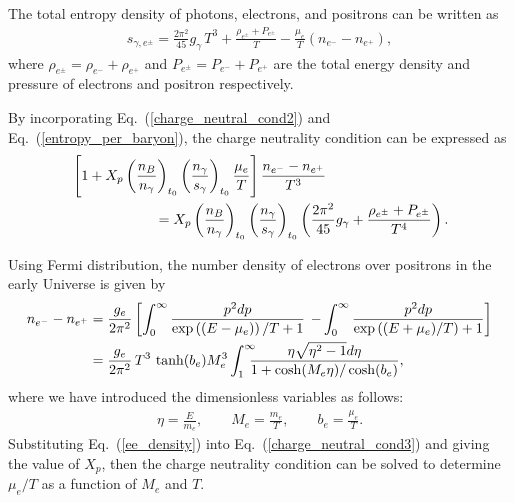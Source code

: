 The total entropy density of photons, electrons, and positrons can be written as
\begin{align}\label{entropy_per_baryon}
s_{\gamma,e^\pm}=\frac{2\pi^2}{45}g_\gamma\,T^3+\frac{\rho_{e^\pm}+P_{e^\pm}}{T}-\frac{\mu_e}{T}(n_{e^-}-n_{{e^+}}),
 \end{align}
where $ \rho_{e^\pm}=\rho_{e^-}+\rho_{e^+}$ and $P_{e^\pm}=P_{e^-}+P_{{e^+}}$ are the total energy density and pressure of electrons and positron respectively.

By incorporating Eq.~(\ref{charge_neutral_cond2}) and Eq.~(\ref{entropy_per_baryon}), the charge neutrality condition can be expressed as
\begin{align}\label{charge_neutral_cond3}
 &\left[1+X_p\left(\frac{n_B}{n_\gamma}\right)_{t_0}\left(\frac{n_\gamma}{s_{\gamma}}\right)_{t_0}\frac{\mu_e}{T}\right]\frac{n_{e^-}-n_{{e^+}}}{T^3}\notag\\
 &\qquad\qquad\qquad=X_p\left(\frac{n_B}{n_\gamma}\right)_{t_0}\left(\frac{n_\gamma}{s_{\gamma}}\right)_{t_0} \left(\frac{2\pi^2}{45}g_\gamma+\frac{\rho_{e^\pm}+P_{e^\pm}}{T^4}\right).
\end{align}

Using Fermi distribution, the number density of electrons over positrons in the early Universe is given by
\begin{align}\label{ee_density}
n_{e^-}-n_{{e^+}}&=\frac{g_e}{2\pi^2}\left[\int_0^\infty\frac{p^2dp}{\exp{\left((E-\mu_e)\right)/T}+1}\right.\left.-\int_0^\infty\frac{p^2dp}{\exp{\left((E+\mu_e)/T\right)}+1}\right]\notag\\
&=\frac{g_e}{2\pi^2}\,{T^3}\,\tanh(b_e)M_e^3\int_{1}^\infty \!\!\!\!\frac{ \eta \sqrt{\eta^2-1} d\eta}{1+\cosh(M_e\eta)/\cosh(b_e)},
\end{align}
where we have introduced the dimensionless variables as follows: 
\begin{align}\label{Variables}
\eta=\frac{E}{m_e},\qquad M_e=\frac{m_e}{T},\qquad b_e=\frac{\mu_e}{T}.
\end{align}
Substituting Eq.~(\ref{ee_density}) into Eq.~(\ref{charge_neutral_cond3}) and giving the value of $X_p$, then the charge neutrality condition can be solved to determine $\mu_e/T$ as a function of $M_e$ and $T$. 

